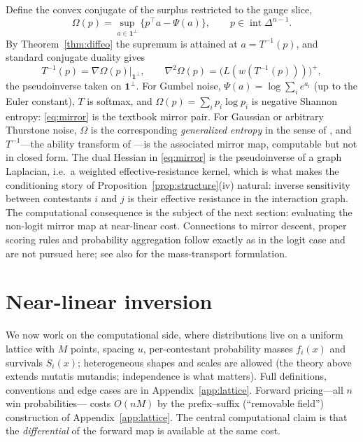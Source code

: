 \documentclass[11pt]{article}
\theoremstyle{definition}
\theoremstyle{remark}
\newcommand{\one}{\mathbf{1}}
\newcommand{\intsimplex}{\operatorname{int}\Delta^{n-1}}
\newcommand{\perpone}{\one^{\perp}}
\begin{document}
Define the convex conjugate of the surplus restricted to the gauge slice,
\[
  \Omega(p) = \sup_{a \in \perpone} \bigl\{ p^\top a - \Psi(a) \bigr\},
  \qquad p \in \intsimplex .
\]
By Theorem~\ref{thm:diffeo} the supremum is attained at $a = T^{-1}(p)$, and
standard conjugate duality \parencite{rockafellar1970} gives
\begin{equation}
  T^{-1}(p) = \nabla \Omega(p) \big|_{\perpone},
  \qquad
  \nabla^2 \Omega(p) = \bigl( L(w(T^{-1}(p))) \bigr)^{+},
  \label{eq:mirror}
\end{equation}
the pseudoinverse taken on $\perpone$.  For Gumbel noise, $\Psi(a) = \log
\sum_i e^{a_i}$ (up to the Euler constant), $T$ is softmax, and $\Omega(p) =
\sum_i p_i \log p_i$ is negative Shannon entropy: \eqref{eq:mirror} is the
textbook mirror pair.  For Gaussian or arbitrary Thurstone noise, $\Omega$ is
the corresponding \emph{generalized entropy} in the sense of
\textcite{fosgerau2020}, and $T^{-1}$---the ability transform of
\textcite{cotton2021}---is the associated mirror map, computable but not in
closed form.  The dual Hessian in \eqref{eq:mirror} is the pseudoinverse of a
graph Laplacian, i.e.\ a weighted effective-resistance kernel, which is what
makes the conditioning story of Proposition~\ref{prop:structure}(iv) natural:
inverse sensitivity between contestants $i$ and $j$ is their effective
resistance in the interaction graph.  The computational consequence is the
subject of the next section: evaluating the non-logit mirror map at near-linear
cost.  Connections to mirror descent, proper scoring rules and probability
aggregation follow exactly as in the logit case and are not pursued here;
see also \textcite{chiong2016} for the mass-transport formulation.

\section{Near-linear inversion}
\label{sec:algorithm}

We now work on the computational side, where distributions live on a uniform
lattice with $M$ points, spacing $u$, per-contestant probability masses
$f_i(x)$ and survivals $S_i(x)$; heterogeneous shapes and scales are allowed
(the theory above extends mutatis mutandis; independence is what matters).
Full definitions, conventions and edge cases are in
Appendix~\ref{app:lattice}.  Forward pricing---all $n$ win probabilities---
costs $O(nM)$ by the prefix--suffix (``removable field'') construction of
Appendix~\ref{app:lattice}.  The central computational claim is that the
\emph{differential} of the forward map is available at the same cost.
\end{document}
